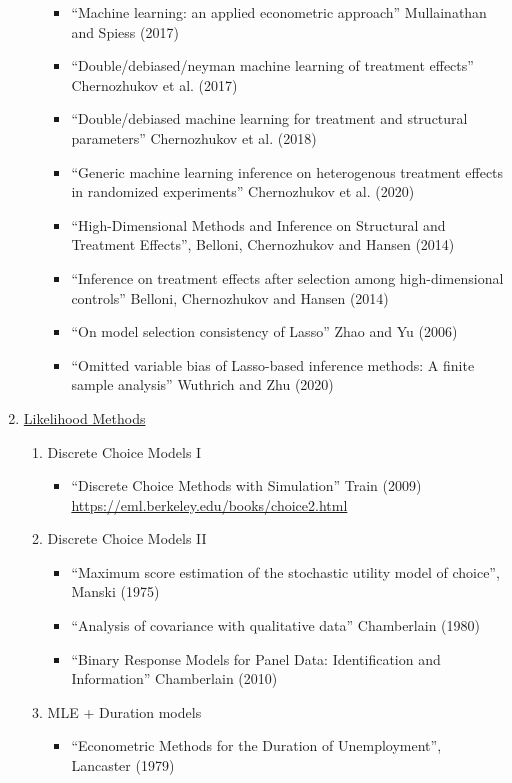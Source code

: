 \documentclass[11pt, a4paper]{article}
\begin{document}
\begin{enumerate}
\begin{enumerate}
\begin{itemize}
    \item ``Machine learning: an applied econometric approach'' Mullainathan and Spiess (2017)
    \item ``Double/debiased/neyman machine learning of treatment effects'' Chernozhukov et al. (2017)
    \item ``Double/debiased machine learning for treatment and structural parameters'' Chernozhukov et al. (2018)
    \item ``Generic machine learning inference on heterogenous treatment effects in randomized experiments'' Chernozhukov et al. (2020)      
    \item ``High-Dimensional Methods and Inference on Structural and Treatment Effects'', Belloni, Chernozhukov  and Hansen (2014)
    \item ``Inference on treatment effects after selection among high-dimensional controls'' Belloni, Chernozhukov  and Hansen (2014)
    \item ``On model selection consistency of Lasso'' Zhao and Yu (2006)
    \item  ``Omitted variable bias of Lasso-based inference methods: A finite sample analysis'' Wuthrich and Zhu (2020)
    \end{itemize}
  \end{enumerate}
\item \underline{Likelihood Methods}
  \begin{enumerate}
  \item Discrete Choice Models I 
    \begin{itemize}
    \item ``Discrete Choice Methods with Simulation'' Train (2009) \url{https://eml.berkeley.edu/books/choice2.html}
    \end{itemize}
  \item Discrete Choice Models II
    \begin{itemize}
    \item ``Maximum score estimation of the stochastic utility model of choice'', Manski (1975)
    \item ``Analysis of covariance with qualitative data'' Chamberlain (1980)
    \item ``Binary Response Models for Panel Data: Identification and Information'' Chamberlain (2010)
    \end{itemize}
  \item MLE + Duration models
    \begin{itemize}
    \item ``Econometric Methods for the Duration of Unemployment'', Lancaster (1979)

\end{itemize}
\end{enumerate}
\end{enumerate}
\end{document}
